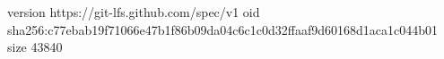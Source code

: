version https://git-lfs.github.com/spec/v1
oid sha256:c77ebab19f71066e47b1f86b09da04c6c1c0d32ffaaf9d60168d1aca1c044b01
size 43840
